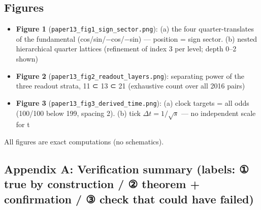 \documentclass[
]{ltjsarticle}
\providecommand{\tightlist}{%
  \setlength{\itemsep}{0pt}\setlength{\parskip}{0pt}}
\begin{document}
\subsection{Figures}\label{figures}

\begin{itemize}
\tightlist
\item
  \textbf{Figure 1} (\texttt{paper13\_fig1\_sign\_sector.png}): (a) the
  four quarter-translates of the fundamental (cos/sin/−cos/−sin) ---
  position = sign sector. (b) nested hierarchical quarter lattices
  (refinement of index 3 per level; depth 0--2 shown)
\item
  \textbf{Figure 2} (\texttt{paper13\_fig2\_readout\_layers.png}):
  separating power of the three readout strata, 11 ⊂ 13 ⊂ 21 (exhaustive
  count over all 2016 pairs)
\item
  \textbf{Figure 3} (\texttt{paper13\_fig3\_derived\_time.png}): (a)
  clock targets = all odds (100/100 below 199, spacing 2). (b) tick
  \(\Delta t=1/\sqrt{s}\) --- no independent scale for t
\end{itemize}

All figures are exact computations (no schematics).

\subsection{Appendix A: Verification summary (labels: ① true by
construction / ② theorem + confirmation / ③ check that could have
failed)}\label{appendix-a-verification-summary-labels-ux2460-true-by-construction-ux2461-theorem-confirmation-ux2462-check-that-could-have-failed}
\end{document}
